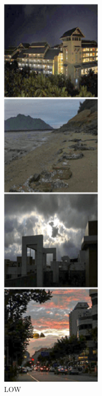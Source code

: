 \documentclass[CJK,aspectratio=169]{beamer}  %
\begin{document}
\begin{frame}
\begin{figure}
\begin{minipage}{.08\paperwidth}
			\label{fig: LOW}
			\caption*{\tiny LOW}
		\end{minipage}
		\begin{minipage}{.08\paperwidth}
			\centering
			\setlength{\abovecaptionskip}{-0.45cm}
			\includegraphics[width=\linewidth]{picture/LLIE/LightingNet/BIMEF}

\end{minipage}
\end{figure}
\end{frame}
\end{document}
